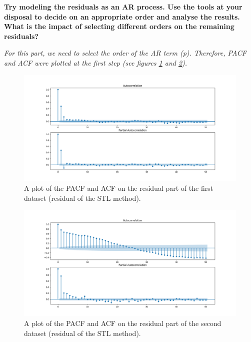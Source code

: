 \item \textbf{Try modeling the residuals as an AR process. Use the tools at your disposal to decide on an appropriate order and analyse the results. What is the impact of selecting different orders on the remaining residuals?}





\textit{For this part, we need to select the order of the \gls{AR} term (p). Therefore, \gls{PACF} and \gls{ACF} were plotted at the first step (see figures \ref{fig:Ass1_D1_PACF_ACF_X} and \ref{fig:Ass1_D2_PACF_ACF_X}).}  

\begin{figure}[H]
    \centering
    \begin{minipage}[b]{1\textwidth}
        \includegraphics[width=\textwidth]{figures/Ass1/Ass1_D1_PACF_ACF_X.png}
    \end{minipage}
    \caption{A plot of the \gls{PACF} and \gls{ACF} on the residual part of the first dataset (residual of the STL method).}
    \label{fig:Ass1_D1_PACF_ACF_X}
\end{figure}

\begin{figure}[H]
    \centering
    \begin{minipage}[b]{1\textwidth}
        \includegraphics[width=\textwidth]{figures/Ass1/Ass1_D2_PACF_ACF_X.png}
    \end{minipage}
    \caption{A plot of the \gls{PACF} and \gls{ACF} on the residual part of the second dataset (residual of the STL method).}
    \label{fig:Ass1_D2_PACF_ACF_X}
\end{figure}


